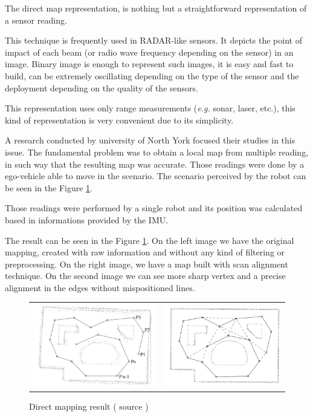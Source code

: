 The direct map representation, is nothing but a straightforward representation of a sensor reading. 

This technique is frequently used in RADAR-like sensors. It depicts the point of impact of each beam (or radio wave frequency depending on the sensor) in an image. Binary image is enough to represent such images, it is easy and fast to build, can be extremely oscillating depending on the type of the sensor and the deployment depending on the quality of the sensors.

This representation uses only range measurements (\textit{e.g.} sonar, laser, etc.), this kind of representation is very convenient due to its simplicity. 

A research conducted by university of North York \cite{Lu:1997:GCR:591441.591464} focused their studies in this issue. The fundamental problem was to obtain a local map from multiple reading, in such way that the resulting map was accurate. Those readings were done by a ego-vehicle able to move in the scenario. The scenario perceived by the robot can be seen in the Figure \ref{fig:mapping:direct:result}.

Those readings were performed by a single robot and its position was calculated based in informations provided by the IMU.

The result can be seen in the Figure \ref{fig:mapping:direct:result}. On the left image we have the original mapping, created with raw information and without any kind of filtering or preprocessing. On the right image, we have a map built with scan alignment technique\cite{Lu:1997:GCR:591441.591464}. On the second image we can see more sharp vertex and a precise alignment in the edges without mispositioned lines.

\begin{figure}[h]
\centering
	\begin{tabular}{lr}\\
		\includegraphics[width=0.5\columnwidth]{img/fig:mapping:direct:a} &
		\includegraphics[width=0.5\columnwidth]{img/fig:mapping:direct:b}
	\end{tabular}
	\caption{Direct mapping result ( source \cite{Lu:1997:GCR:591441.591464} )}
	\label{fig:mapping:direct:result}
\end{figure}

